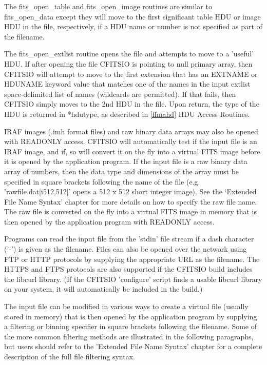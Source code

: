 \documentclass[11pt]{book}
\begin{document}
\begin{description}
The fits\_open\_table and fits\_open\_image routines are similar to
fits\_open\_data except they will move to the first significant table
HDU or image HDU in the file, respectively, if a HDU name or
number is not specified as part of the filename.

The fits\_open\_extlist routine opens the file and attempts to move to
a 'useful' HDU. If after opening the file CFITSIO is pointing to null
primary array, then CFITSIO will attempt to move to the first
extension that has an EXTNAME or HDUNAME keyword value that matches
one of the names in the input extlist space-delimited list of names
(wildcards are permitted).  If that fails, then CFITSIO simply moves
to the 2nd HDU in the file.  Upon return, the type of the HDU is
returned in *hdutype, as described in \ref{ffmahd} HDU Access Routines.

IRAF images (.imh format files) and raw binary data arrays may also be
opened with READONLY access.  CFITSIO will automatically test if the
input file is an IRAF image, and if, so will convert it on the fly into
a virtual FITS image before it is opened by the application program.
If the input file is a raw binary data array of numbers, then the data type
and dimensions of the array must be specified in square brackets
following the name of the file (e.g.  'rawfile.dat[i512,512]' opens a
512 x 512 short integer image).  See the `Extended File Name Syntax'
chapter for more details on how to specify the raw file name.  The raw
file is converted on the fly into a virtual FITS image in memory that
is then opened by the application program with READONLY access.

Programs can read the input file from the 'stdin' file stream if a dash
character ('-') is given as the filename. Files can also be opened over
the network using FTP or HTTP protocols by supplying the appropriate URL
as the filename.  The HTTPS and FTPS protocols are also supported if the CFITSIO
build includes the libcurl library.  (If the CFITSIO 'configure' script
finds a usable libcurl library on your system, it will automatically be 
included in the build.)

The input file can be modified in various ways to create a virtual file
(usually stored in memory) that is then opened by the application
program by supplying a filtering or binning specifier in square brackets
following the filename. Some of the more common filtering methods are
illustrated in the following paragraphs, but users should refer to the
'Extended File Name Syntax' chapter for a complete description of
the full file filtering syntax.


\end{description}
\end{document}
